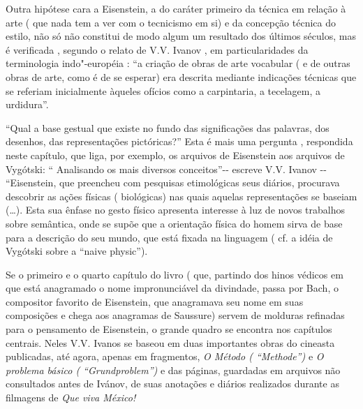 Outra hipótese cara a Eisenstein, a do caráter primeiro da técnica em
relação à arte ( que nada tem a ver com o tecnicismo em si) e da
concepção técnica do estilo, não só não constitui de modo algum um
resultado dos últimos séculos, mas é verificada , segundo o relato de
V.V. Ivanov , em particularidades da terminologia indo"-européia : ``a
criação de obras de arte vocabular ( e de outras obras de arte, como é
de se esperar) era descrita mediante indicações técnicas que se referiam
inicialmente àqueles ofícios como a carpintaria, a tecelagem, a
urdidura''.

``Qual a base gestual que existe no fundo das significações das
palavras, dos desenhos, das representações pictóricas?'' Esta é mais uma
pergunta , respondida neste capítulo, que liga, por exemplo, os arquivos
de Eisenstein aos arquivos de Vygótski: `` Analisando os mais diversos
conceitos''-\/- escreve V.V. Ivanov -\/- ``Eisenstein, que preencheu com
pesquisas etimológicas seus diários, procurava descobrir as ações
físicas ( biológicas) nas quais aquelas representações se baseiam (\ldots{}).
Esta sua ênfase no gesto físico apresenta interesse à luz de novos
trabalhos sobre semântica, onde se supõe que a orientação física do
homem sirva de base para a descrição do seu mundo, que está fixada na
linguagem ( cf. a idéia de Vygótski sobre a ``naive physic'').

Se o primeiro e o quarto capítulo do livro ( que, partindo dos hinos
védicos em que está anagramado o nome impronunciável da divindade, passa
por Bach, o compositor favorito de Eisenstein, que anagramava seu nome
em suas composições e chega aos anagramas de Saussure) servem de
molduras refinadas para o pensamento de Eisenstein, o grande quadro se
encontra nos capítulos centrais. Neles V.V. Ivanos se baseou em duas
importantes obras do cineasta publicadas, até agora, apenas em
fragmentos, \emph{O Método ( ``Methode'')} e \emph{O problema básico (
``Grundproblem'')} e das páginas, guardadas em arquivos não consultados
antes de Ivánov, de suas anotações e diários realizados durante as
filmagens de \emph{Que viva México!}

